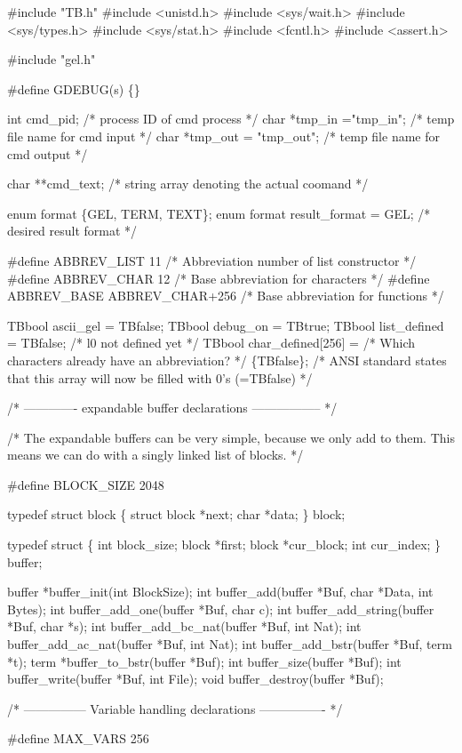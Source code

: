 #include "TB.h"
#include <unistd.h>
#include <sys/wait.h>
#include <sys/types.h>
#include <sys/stat.h>
#include <fcntl.h>
#include <assert.h>

#include "gel.h"

#define GDEBUG(s) \{\}

int cmd_pid;                /* process ID of cmd process */
char *tmp_in  ="tmp_in";    /* temp file name for cmd input */
char *tmp_out = "tmp_out";  /* temp file name for cmd output */

char **cmd_text;           /* string array denoting the actual coomand */

enum format \{GEL, TERM, TEXT\};
enum format result_format = GEL; /* desired result format */

#define ABBREV_LIST 11 /* Abbreviation number of list constructor */
#define ABBREV_CHAR 12 /* Base abbreviation for characters */
#define ABBREV_BASE ABBREV_CHAR+256 /* Base abbreviation for functions */

TBbool ascii_gel = TBfalse;
TBbool debug_on  = TBtrue;
TBbool list_defined = TBfalse;  /* l0 not defined yet */
TBbool char_defined[256] =  /* Which characters already have an abbreviation? */
\{TBfalse\};
/* ANSI standard states that this array will now be filled with 0's (=TBfalse) */

/* ------------- expandable buffer declarations ----------------- */

/* The expandable buffers can be very simple, because we only add
   to them. This means we can do with a singly linked list of blocks.
*/

#define BLOCK_SIZE 2048

typedef struct block
\{
  struct block *next;
  char *data;
\} block;

typedef struct
\{
  int block_size;
  block *first;
  block *cur_block;
  int cur_index;
\} buffer;

buffer *buffer_init(int BlockSize);
int buffer_add(buffer *Buf, char *Data, int Bytes);
int buffer_add_one(buffer *Buf, char c);
int buffer_add_string(buffer *Buf, char *s);
int buffer_add_bc_nat(buffer *Buf, int Nat);
int buffer_add_ac_nat(buffer *Buf, int Nat);
int buffer_add_bstr(buffer *Buf, term *t);
term *buffer_to_bstr(buffer *Buf);
int buffer_size(buffer *Buf);
int buffer_write(buffer *Buf, int File);
void buffer_destroy(buffer *Buf);

/* --------------- Variable handling declarations ---------------- */

#define MAX_VARS 256

